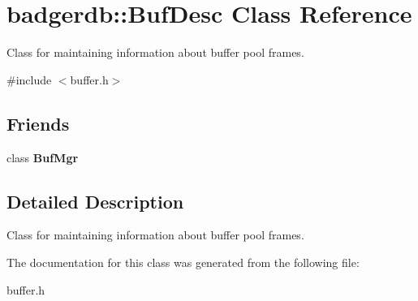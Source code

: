 \hypertarget{classbadgerdb_1_1BufDesc}{\section{badgerdb\-:\-:Buf\-Desc Class Reference}
\label{classbadgerdb_1_1BufDesc}
}


Class for maintaining information about buffer pool frames.  




{\ttfamily \#include $<$buffer.\-h$>$}

\subsection*{Friends}
\begin{DoxyCompactItemize}
\item 
\hypertarget{classbadgerdb_1_1BufDesc_a68a244eea2a2589e5479f3a35f9473fa}{class {\bfseries Buf\-Mgr}}\label{classbadgerdb_1_1BufDesc_a68a244eea2a2589e5479f3a35f9473fa}

\end{DoxyCompactItemize}


\subsection{Detailed Description}
Class for maintaining information about buffer pool frames. 

The documentation for this class was generated from the following file\-:\begin{DoxyCompactItemize}
\item 
buffer.\-h\end{DoxyCompactItemize}
